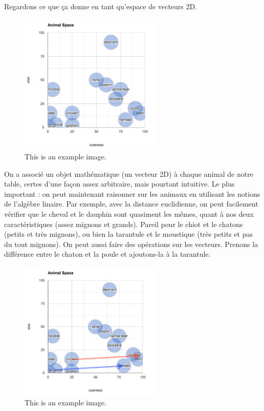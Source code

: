 \documentclass[11pt, a4paper]{report}
\begin{document}
Regardons ce que ça donne en tant qu'espace de vecteurs 2D. 

\begin{figure}[h]
  \centering
  \includegraphics[width=0.6\textwidth]{animal-space.png}
  \caption{This is an example image.}
  \label{fig:example}
\end{figure}

On a associé un objet mathématique (un vecteur 2D) à chaque animal de notre table, certes d'une façon
assez arbitraire, mais pourtant intuitive. Le plus important : on peut maintenant raisonner sur les animaux en 
utilisant les notions de l'algèbre linaire. Par exemple, avec la distance euclidienne, on peut facilement 
vérifier que le cheval et le dauphin sont quasiment les mêmes, quant à nos deux caractéristiques 
(assez mignons et grands). Pareil pour le chiot et le chatons (petits et très mignons), ou bien la 
tarantule et le moustique (très petits et pas du tout mignons). On peut aussi faire des opérations sur 
les vecteurs. Prenons la différence entre le chaton et la poule et ajoutons-la à la tarantule. 

\begin{figure}[h]
  \centering
  \includegraphics[width=0.6\textwidth]{animal-space-dif.png}
  \caption{This is an example image.}
  \label{fig:example}
\end{figure}
\end{document}
